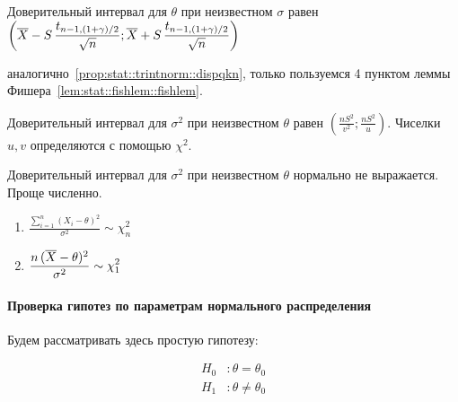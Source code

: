\documentclass[12pt,timbord]{../../../notes}
\begin{document}
\begin{prop}\label{prop:stat::trintnorm::qdispukn}
  Доверительный интервал для $\theta$ при неизвестном $\sigma$ равен 
  $\displaystyle \left( \overline{X} - S \, \frac{t_{n-1,(1+\gamma)/2}}{ \sqrt n} ;
  \overline{X} + S \, \frac{t_{n-1,(1+\gamma)/2}}{\sqrt n} \right)$
\end{prop}
\begin{itlproof}
  аналогично~\ref{prop:stat::trintnorm::dispqkn}, только пользуемся 4 пунктом леммы
  Фишера~\ref{lem:stat::fishlem::fishlem}.
\end{itlproof}

\begin{prop}\label{prop:stat::trintnorm::dispqukn}
  Доверительный интервал для $\sigma^2$ при неизвестном $\theta$ равен 
  $\displaystyle \left( \frac{n S^2}{v^2} ; \frac{n S^2}{u} \right)$. Чиселки $u,v$ определяются
  с помощью $\chi^2$.
\end{prop}

\begin{prop}\label{prop:stat::trintnorm::dispqkn}
  Доверительный интервал для $\sigma^2$ при неизвестном $\theta$ нормально не выражается. Проще
  численно.
  \begin{enumerate}
    \item $\displaystyle \frac{\sum_{i=1}^n (X_i - \theta)^2}{\sigma^2} \sim \chi_n^2 $
    \item $\displaystyle \frac{n\, (\overline{X} - \theta)^2}{\sigma^2} \sim \chi_1^2 $
  \end{enumerate}
\end{prop}

\paragraph{Проверка гипотез по параметрам нормального распределения}
\label{par:stat::hypnorm}

Будем рассматривать здесь простую гипотезу:

\[
  \begin{split}
    H_0 & \colon \theta = \theta_0 \\
    H_1 & \colon \theta \neq \theta_0 
  \end{split}
  \]
\end{document}
